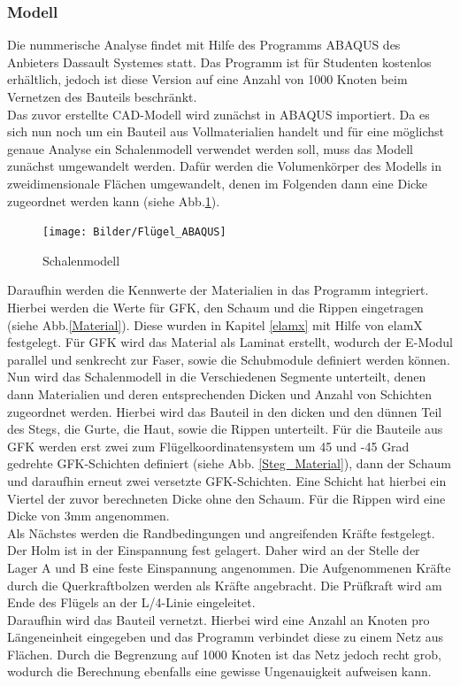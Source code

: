 
\subsubsection{Modell}
Die nummerische Analyse findet mit Hilfe des Programms ABAQUS des Anbieters Dassault Systemes statt. Das Programm ist für Studenten kostenlos erhältlich, jedoch ist diese Version auf eine Anzahl von 1000 Knoten beim Vernetzen des Bauteils beschränkt.\\
Das zuvor erstellte CAD-Modell wird zunächst in ABAQUS importiert. Da es sich nun noch um ein Bauteil aus Vollmaterialien handelt und für eine möglichst genaue Analyse ein Schalenmodell verwendet werden soll, muss das Modell zunächst umgewandelt werden. Dafür werden die Volumenkörper des Modells in zweidimensionale Flächen umgewandelt, denen im Folgenden dann eine Dicke zugeordnet werden kann (siehe Abb.\ref{Schalenmodell}).

\begin{figure}[h]
 \centering
 \texttt{[image: Bilder/Flügel\_ABAQUS]}
 \caption{Schalenmodell}
 \label{Schalenmodell}
\end{figure}
\newpage
\noindent
Daraufhin werden die Kennwerte der Materialien in das Programm integriert. Hierbei werden die Werte für GFK, den Schaum und die Rippen eingetragen (siehe Abb.\ref{Material}). Diese wurden in Kapitel \ref{elamx} mit Hilfe von elamX festgelegt. Für GFK wird das Material als Laminat erstellt, wodurch der E-Modul parallel und senkrecht zur Faser, sowie die Schubmodule definiert werden können.\\
\noindent
Nun wird das Schalenmodell in die Verschiedenen Segmente unterteilt, denen dann Materialien und deren entsprechenden Dicken und Anzahl von Schichten zugeordnet werden. Hierbei wird das Bauteil in den dicken und den dünnen Teil des Stegs, die Gurte, die Haut, sowie die Rippen unterteilt. Für die Bauteile aus GFK werden erst zwei zum Flügelkoordinatensystem um 45 und -45 Grad gedrehte GFK-Schichten definiert (siehe Abb. \ref{Steg_Material}), dann der Schaum und daraufhin erneut zwei versetzte GFK-Schichten. Eine Schicht hat hierbei ein Viertel der zuvor berechneten Dicke ohne den Schaum. Für die Rippen wird eine Dicke von 3mm angenommen.\\
\noindent
Als Nächstes werden die Randbedingungen und angreifenden Kräfte festgelegt. Der Holm ist in der Einspannung fest gelagert. Daher wird an der Stelle der Lager A und B eine feste Einspannung angenommen. Die Aufgenommenen Kräfte durch die Querkraftbolzen werden als Kräfte angebracht. Die Prüfkraft wird am Ende des Flügels an der L/4-Linie eingeleitet.\\
Daraufhin wird das Bauteil vernetzt. Hierbei wird eine Anzahl an Knoten pro Längeneinheit eingegeben und das Programm verbindet diese zu einem Netz aus Flächen. Durch die Begrenzung auf 1000 Knoten ist das Netz jedoch recht grob, wodurch die Berechnung ebenfalls eine gewisse Ungenauigkeit aufweisen kann. \\
\newpage
